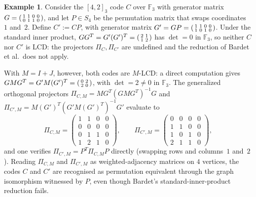\documentclass[11pt]{article}
\newcommand{\FF}{\mathbb{F}}
\newcommand{\0}{\mathbf{0}}
\newcommand{\1}{\mathbf{1}}
\theoremstyle{plain}
\theoremstyle{definition}
\newtheorem{example}[theorem]{Example}
\theoremstyle{remark}
\begin{document}
\begin{example}
\label{ex:gi_reduction}
Consider the $[4, 2]_3$ code $C$ over $\FF_3$ with generator matrix $G = \begin{psmallmatrix} 1 & 1 & 0 & 0 \\ 0 & 1 & 1 & 0 \end{psmallmatrix}$, and let $P \in S_4$ be the permutation matrix that swaps coordinates~$1$ and~$2$. Define $C' := CP$, with generator matrix $G' = GP = \begin{psmallmatrix} 1 & 1 & 0 & 0 \\ 1 & 0 & 1 & 0 \end{psmallmatrix}$.
Under the standard inner product, $GG^T = G'(G')^T = \begin{psmallmatrix} 2 & 1 \\ 1 & 2 \end{psmallmatrix}$ has $\det = 0$ in $\FF_3$, so neither $C$ nor $C'$ is LCD: the projectors $\Pi_C, \Pi_{C'}$ are undefined and the reduction of Bardet et al.\ does not apply.

With $M = I + J$, however, both codes are $M$-LCD: a direct computation gives $GMG^T = G'M(G')^T = \begin{psmallmatrix} 0 & 2 \\ 2 & 0 \end{psmallmatrix}$, with $\det = 2 \neq 0$ in $\FF_3$. The generalized orthogonal projectors $\Pi_{C,M} = MG^T(GMG^T)^{-1}G$ and $\Pi_{C',M} = M(G')^T(G'M(G')^T)^{-1}G'$ evaluate to
\[
\Pi_{C,M} = \begin{pmatrix}
1 & 1 & 0 & 0 \\
0 & 0 & 0 & 0 \\
0 & 1 & 1 & 0 \\
1 & 2 & 1 & 0
\end{pmatrix},
\qquad
\Pi_{C',M} = \begin{pmatrix}
0 & 0 & 0 & 0 \\
1 & 1 & 0 & 0 \\
1 & 0 & 1 & 0 \\
2 & 1 & 1 & 0
\end{pmatrix},
\]
and one verifies $\Pi_{C',M} = P^T \Pi_{C,M} P$ directly (swapping rows and columns~$1$ and~$2$). Reading $\Pi_{C,M}$ and $\Pi_{C',M}$ as weighted-adjacency matrices on $4$ vertices, the codes $C$ and $C'$ are recognised as permutation equivalent through the graph isomorphism witnessed by $P$, even though Bardet's standard-inner-product reduction fails.
\end{example}
\end{document}
